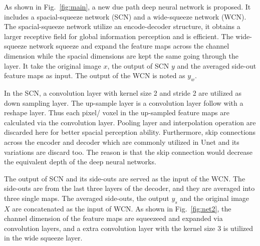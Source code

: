 \documentclass[10pt,twocolumn,letterpaper]{article}
\begin{document}
As shown in Fig.~\cref{fig:main}, a new due path deep neural network is proposed. 
It includes a spacial-squeeze network (SCN) and a wide-squeeze network (WCN). 
The spacial-squeeze network utilize an encode-decoder structure, it obtains a larger receptive field for global information perception and is efficient. 
The wide-squeeze network squeeze and expand the feature maps across the channel dimension while the spacial dimensions are kept the same going through the layer. 
It take the original image $x$, the output of SCN $y$ and the averaged side-out feature maps as input. 
The output of the WCN is noted as $y_w$. 

In the SCN, a convolution layer with kernel size 2 and stride 2 are utilized as down sampling layer. 
The up-sample layer is a convolution layer follow with a reshape layer. 
Thus each pixel/ voxel in the up-sampled feature maps are calculated via the convolution layer. 
Pooling layer and interpolation operation are discarded here for better spacial perception ability. 
Furthermore, skip connections across the encoder and decoder which are commonly utilized in Unet and its variations are discard too. 
The reason is that the skip connection would decrease the equivalent depth of the deep neural networks. 

The output of SCN and its side-outs are served as the input of the WCN. 
The side-outs are from the last three layers of the decoder, and they are averaged into three single maps. 
The averaged side-outs, the output $y_s$ and the original image $X$ are concatenated as the input of WCN.
As shown in Fig.~\cref{fig:net2}, the channel dimension of the feature maps are squeezeed and expanded via convolution layers, and a extra convolution layer with the kernel size 3 is utilized in the wide squeeze layer. 








\end{document}

